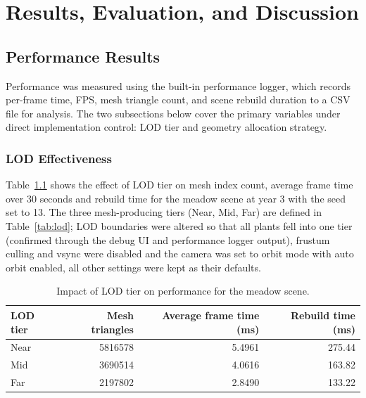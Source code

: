 \chapter{Results, Evaluation, and Discussion}
\label{chapter4}

\section{Performance Results}

Performance was measured using the built-in performance logger, which records per-frame time, FPS, mesh
triangle count, and scene rebuild duration to a CSV file for analysis. The two subsections below cover the
primary variables under direct implementation control: LOD tier and geometry allocation strategy.

\subsection{LOD Effectiveness}

Table~\ref{tab:lod-perf} shows the effect of LOD tier on mesh index count, average frame time over 30 seconds
and rebuild time for the meadow scene at year 3 with the seed set to 13. The three mesh-producing tiers
(Near, Mid, Far) are defined in Table~\ref{tab:lod}; LOD boundaries were altered so that all plants fell into
one tier (confirmed through the debug UI and performance logger output), frustum culling and vsync were
disabled and the camera was set to orbit mode with auto orbit enabled, all other settings were kept as their
defaults.

\begin{table}[h]
  \centering
  \begin{tabular}{|l|r|r|r|}
    \hline
    \textbf{LOD tier} & \textbf{Mesh triangles} & \textbf{Average frame time (ms)} & \textbf{Rebuild time (ms)} \\
    \hline
    Near              & 5816578                 & 5.4961                           & 275.44 \\
    Mid               & 3690514                 & 4.0616                           & 163.82 \\
    Far               & 2197802                 & 2.8490                           & 133.22 \\
    \hline
  \end{tabular}
  \caption{Impact of LOD tier on performance for the meadow scene.}
  \label{tab:lod-perf}
\end{table}

